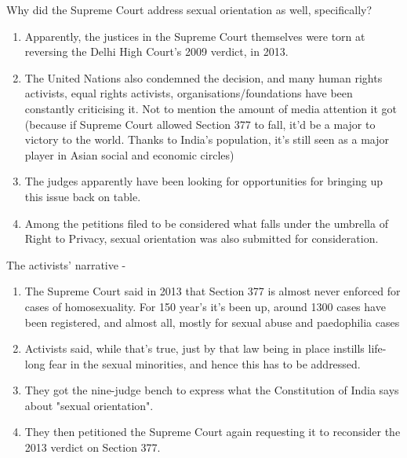 \documentclass[11pt]{article}
\begin{document}
Why did the Supreme Court address sexual orientation as well, specifically? 
\begin{enumerate}[noitemsep]
	\item Apparently, the justices in the Supreme Court themselves were torn at reversing the Delhi High Court's 2009 verdict, in 2013. 
	\item  The United Nations also condemned the decision, and many human rights activists, equal rights activists, organisations/foundations have been constantly criticising it. Not to mention the amount of media attention it got (because if Supreme Court allowed Section 377 to fall, it'd be a major to victory to the world. Thanks to India's population, it's still seen as a major player in Asian social and economic circles)
	\item The judges apparently have been looking for opportunities for bringing up this issue back on table. 
	\item Among the petitions filed to be considered what falls under the umbrella of Right to Privacy, sexual orientation was also submitted for consideration.
\end{enumerate}

The activists' narrative -
\begin{enumerate}[noitemsep]
	\item The Supreme Court said in 2013 that Section 377 is almost never enforced for cases of homosexuality. For 150 year's it's been up, around 1300 cases have been registered, and almost all, mostly for sexual abuse and paedophilia cases
	\item Activists said, while that's true, just by that law being in place instills life-long fear in the sexual minorities, and hence this has to be addressed.
	\item They got the nine-judge bench to express what the Constitution of India says about "sexual orientation". 
	\item They then petitioned the Supreme Court again requesting it to reconsider the 2013 verdict on Section 377.
\end{enumerate}
\end{document}

